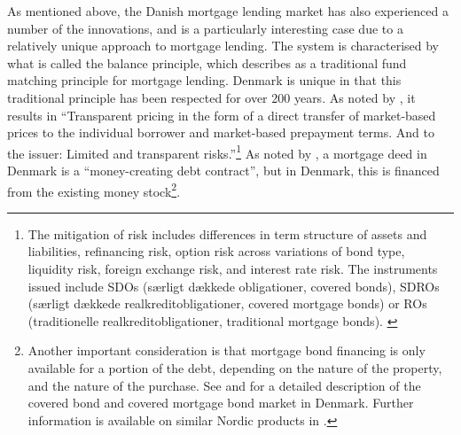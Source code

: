 \documentclass[
]{book}
\begin{document}
As mentioned above, the Danish mortgage lending market has also experienced a number
of the innovations, and is a particularly interesting case due
to a relatively unique approach to mortgage lending.
The system is characterised by what is called the balance principle, which \citet{laustsen2009}
describes as a traditional fund matching principle for mortgage lending. Denmark is
unique in that this traditional principle has been respected for over 200 years. As
noted by \citet[pp.~1]{laustsen2009}, it results in ``Transparent pricing in the form of a direct
transfer of market-based prices to the individual borrower and market-based prepayment
terms. And to the issuer: Limited and transparent risks.''\footnote{The mitigation of risk includes differences in term structure of assets
  and liabilities, refinancing risk, option risk across variations of bond type,
  liquidity risk, foreign exchange risk, and interest rate risk. The instruments issued
  include SDOs (særligt dækkede obligationer, covered bonds), SDROs (særligt dækkede
  realkreditobligationer, covered mortgage bonds) or ROs (traditionelle realkreditobligationer,
  traditional mortgage bonds). \citep{laustsen2009}} As noted by
\citet[pp.~2]{haldrup2017}, a mortgage deed in Denmark is a ``money-creating debt contract'', but in
Denmark, this is financed from the existing money stock\footnote{Another important consideration is that mortgage bond financing is only
  available for a portion of the debt, depending on the nature of the property, and the
  nature of the purchase. See \citet{danske2017danish} and \citet{nykredit2018} for a detailed description
  of the covered bond and covered mortgage bond market in Denmark. Further information is
  available on similar Nordic products in \citet{danske2017nordic}.}.
\end{document}
